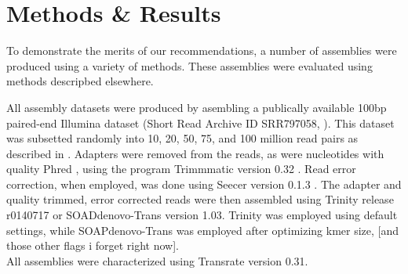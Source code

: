 \section*{Methods & Results}

To demonstrate the merits of our recommendations, a number of assemblies were produced using a variety of methods. These assemblies were evaluated using methods descripbed elsewhere. 

All assembly datasets were produced by asembling a publically available 100bp paired-end Illumina dataset (Short Read Archive ID SRR797058, \citep{Macfarlan:2012js}). This dataset was subsetted randomly into 10, 20, 50, 75, and 100 million read pairs as described in \citep{MacManes:2014io}. Adapters were removed from the reads, as were nucleotides with quality Phred , using the program Trimmmatic version 0.32 \citep{Bolger:2014ek}. Read error correction, when employed, was done using Seecer version 0.1.3 \citep{Le:2013dy}. The adapter and quality trimmed, error corrected reads were then assembled using Trinity release r0140717 or SOADdenovo-Trans version 1.03. Trinity was employed using default settings, while SOAPdenovo-Trans was employed after optimizing kmer size, [and those other flags i forget right now]. \\

All assemblies were characterized using Transrate version 0.31. 
